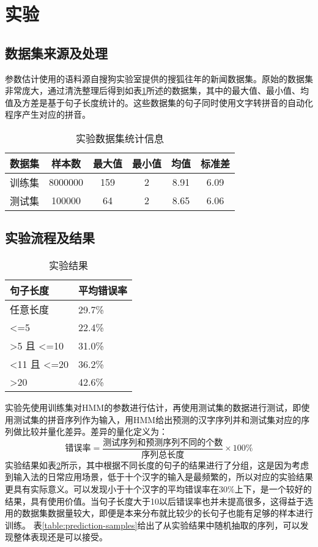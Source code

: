 \documentclass[12pt,a4paper,draft]{ctexart}
\begin{document}
\section{实验}
\subsection{数据集来源及处理}
参数估计使用的语料源自搜狗实验室提供的搜狐往年的新闻数据集\cite{SogouCS}。原始的数据集非常庞大，通过清洗整理后得到如表\ref{table:dataset-stat}所述的数据集，其中的最大值、最小值、均值及方差是基于句子长度统计的。这些数据集的句子同时使用文字转拼音的自动化程序\cite{python-pinyin}产生对应的拼音。
\begin{table}[H]
	\centering
\begin{tabular}{cccccc}
	\toprule  %
	数据集 & 样本数 & 最大值 & 最小值& 均值& 标准差\\
	\midrule  %
		训练集 & 8000000       & 159 & 2&8.91 & 6.09\\
测试集 & 100000 & 64 & 2 & 8.65 & 6.06\\
	\bottomrule %
\end{tabular}
\caption{实验数据集统计信息}
\label{table:dataset-stat}
\end{table}

\subsection{实验流程及结果}
\begin{table}[H]
	\centering
	\begin{tabular}{@{}ll@{}}
		\toprule
		句子长度 & 平均错误率 \\ \midrule
		任意长度 & 29.7\% \\
		\textless{}=5 & 22.4\% \\
		\textgreater{}5 且 \textless{}=10 & 31.0\% \\
		\textless{}11 且 \textless{}=20 & 36.2\% \\
		\textgreater{}20 & 42.6\% \\ \bottomrule
	\end{tabular}
	\caption{实验结果}
	\label{table:experiment-result}
\end{table}
实验先使用训练集对HMM的参数进行估计，再使用测试集的数据进行测试，即使用测试集的拼音序列作为输入，用HMM给出预测的汉字序列并和测试集对应的序列做比较并量化差异。差异的量化定义为：
\[ \mbox{错误率}=\frac{\mbox{测试序列和预测序列不同的个数}}{\mbox{序列总长度}} \times 100\% \]
实验结果如表\ref{table:experiment-result}所示，其中根据不同长度的句子的结果进行了分组，这是因为考虑到输入法的日常应用场景，低于十个汉字的输入是最频繁的，所以对应的实验结果更具有实际意义。可以发现小于十个汉字的平均错误率在30\%上下，是一个较好的结果，具有使用价值。当句子长度大于10以后错误率也并未提高很多，这得益于选用的数据集数据量较大，即便是本来分布就比较少的长句子也能有足够的样本进行训练。
表\ref{table:prediction-samples}给出了从实验结果中随机抽取的序列，可以发现整体表现还是可以接受。
\end{document}
